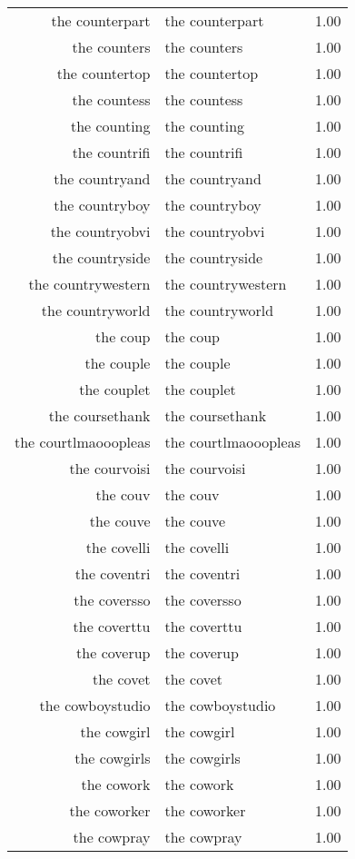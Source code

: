 \begin{table}[ht]
\begin{tabular}{rlr}
  the counterpart & the counterpart & 1.00 \\ 
  the counters & the counters & 1.00 \\ 
  the countertop & the countertop & 1.00 \\ 
  the countess & the countess & 1.00 \\ 
  the counting & the counting & 1.00 \\ 
  the countrifi & the countrifi & 1.00 \\ 
  the countryand & the countryand & 1.00 \\ 
  the countryboy & the countryboy & 1.00 \\ 
  the countryobvi & the countryobvi & 1.00 \\ 
  the countryside & the countryside & 1.00 \\ 
  the countrywestern & the countrywestern & 1.00 \\ 
  the countryworld & the countryworld & 1.00 \\ 
  the coup & the coup & 1.00 \\ 
  the couple & the couple & 1.00 \\ 
  the couplet & the couplet & 1.00 \\ 
  the coursethank & the coursethank & 1.00 \\ 
  the courtlmaooopleas & the courtlmaooopleas & 1.00 \\ 
  the courvoisi & the courvoisi & 1.00 \\ 
  the couv & the couv & 1.00 \\ 
  the couve & the couve & 1.00 \\ 
  the covelli & the covelli & 1.00 \\ 
  the coventri & the coventri & 1.00 \\ 
  the coversso & the coversso & 1.00 \\ 
  the coverttu & the coverttu & 1.00 \\ 
  the coverup & the coverup & 1.00 \\ 
  the covet & the covet & 1.00 \\ 
  the cowboystudio & the cowboystudio & 1.00 \\ 
  the cowgirl & the cowgirl & 1.00 \\ 
  the cowgirls & the cowgirls & 1.00 \\ 
  the cowork & the cowork & 1.00 \\ 
  the coworker & the coworker & 1.00 \\ 
  the cowpray & the cowpray & 1.00 \\ 

\end{tabular}
\end{table}
